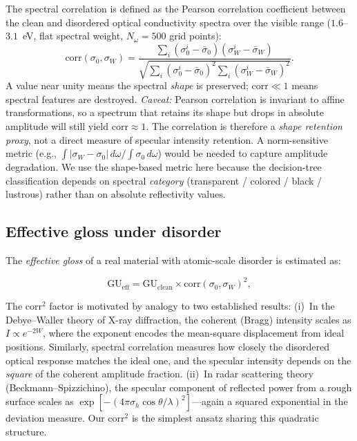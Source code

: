 \documentclass[twocolumn,showpacs,preprintnumbers,amsmath,amssymb,prb]{revtex4-2}
\begin{document}
The spectral correlation is defined as the Pearson correlation
coefficient between the clean and disordered optical conductivity
spectra over the visible range ($1.6$--$3.1$~eV, flat spectral
weight, $N_\omega = 500$ grid points):
\begin{equation}
  \mathrm{corr}(\sigma_0, \sigma_W) =
  \frac{\sum_i (\sigma_0^i - \bar{\sigma}_0)
        (\sigma_W^i - \bar{\sigma}_W)}
  {\sqrt{\sum_i (\sigma_0^i - \bar{\sigma}_0)^2
         \sum_i (\sigma_W^i - \bar{\sigma}_W)^2}}.
  \label{eq:corr}
\end{equation}
A value near unity means the spectral \emph{shape} is preserved;
$\mathrm{corr} \ll 1$ means spectral features are destroyed.
\emph{Caveat:} Pearson correlation is invariant to affine
transformations, so a spectrum that retains its shape but drops
in absolute amplitude will still yield $\mathrm{corr} \approx 1$.
The correlation is therefore a \emph{shape retention proxy},
not a direct measure of specular intensity retention.
A norm-sensitive metric (e.g.,
$\int |\sigma_W - \sigma_0|\,d\omega / \int \sigma_0\,d\omega$)
would be needed to capture amplitude degradation.
We use the shape-based metric here because the
decision-tree classification depends on spectral \emph{category}
(transparent / colored / black / lustrous) rather than on
absolute reflectivity values.

\subsection{Effective gloss under disorder}

The \emph{effective gloss} of a real material with atomic-scale disorder
is estimated as:

\begin{equation}
  \mathrm{GU}_\mathrm{eff} = \mathrm{GU}_\mathrm{clean} \times
    \mathrm{corr}(\sigma_0, \sigma_W)^2,
  \label{eq:eff_gloss}
\end{equation}

\noindent The $\mathrm{corr}^2$ factor is motivated by analogy to two
established results: (i)~In the Debye--Waller theory of X-ray diffraction,
the coherent (Bragg) intensity scales as $I \propto e^{-2W}$, where the
exponent encodes the mean-square displacement from ideal positions.
Similarly, spectral correlation measures how closely the disordered
optical response matches the ideal one, and the specular intensity
depends on the \emph{square} of the coherent amplitude fraction.
(ii)~In radar scattering theory (Beckmann--Spizzichino), the specular
component of reflected power from a rough surface scales as
$\exp[-(4\pi\sigma_h\cos\theta/\lambda)^2]$---again a squared
exponential in the deviation measure. Our $\mathrm{corr}^2$ is the
simplest ansatz sharing this quadratic structure.
\end{document}
